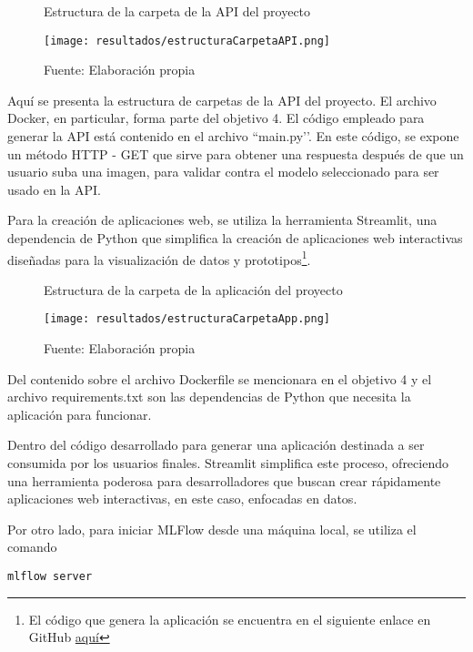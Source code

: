 \newpage

\begin{figure}[h]
\centering
\caption{Estructura de la carpeta de la API del proyecto}
\texttt{[image: resultados/estructuraCarpetaAPI.png]}
\caption*{\footnotesize Fuente: Elaboración propia}
\label{fig:figuraEstructuraCarpetaAPI}
\end{figure}

Aquí se presenta la estructura de carpetas de la API del proyecto. El archivo Docker, en particular, forma parte del objetivo 4. El código empleado para generar la API está contenido en el archivo ``main.py’’. En este código, se expone un método HTTP - GET que sirve para obtener una respuesta después de que un usuario suba una imagen, para validar contra el modelo seleccionado para ser usado en la API.

Para la creación de aplicaciones web, se utiliza la herramienta Streamlit, una dependencia de Python que simplifica la creación de aplicaciones web interactivas diseñadas para la visualización de datos y prototipos\footnote{El código que genera la aplicación se encuentra en el siguiente enlace en GitHub \href{https://github.com/juferoto/mlops_project/tree/master/application/src/webapp}{aquí}}.

\begin{figure}[h]
\centering
\caption{Estructura de la carpeta de la aplicación del proyecto}
\texttt{[image: resultados/estructuraCarpetaApp.png]}
\caption*{\footnotesize Fuente: Elaboración propia}
\label{fig:figuraEstructuraCarpetaApp}
\end{figure}

Del contenido sobre el archivo Dockerfile se mencionara en el objetivo 4 y el archivo requirements.txt son las dependencias de Python que necesita la aplicación para funcionar.

\newpage

Dentro del código desarrollado para generar una aplicación destinada a ser consumida por los usuarios finales. Streamlit simplifica este proceso, ofreciendo una herramienta poderosa para desarrolladores que buscan crear rápidamente aplicaciones web interactivas, en este caso, enfocadas en datos. \newline

Por otro lado, para iniciar MLFlow desde una máquina local, se utiliza el comando 
\begin{verbatim}
mlflow server
\end{verbatim}

